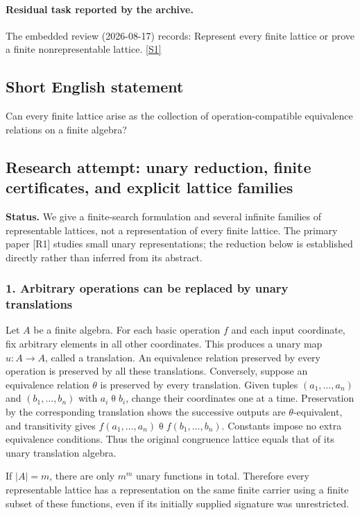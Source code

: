\documentclass[11pt,a4paper]{article}
\newcommand{\sref}[2]{\hyperlink{source:#1:#2}{[S#2]}}
\begin{document}
\paragraph{Residual task reported by the archive.}

The embedded review (2026-08-17) records: Represent every finite lattice or prove a finite nonrepresentable lattice. \sref{1453}{1}

\subsection{Short English statement}

Can every finite lattice arise as the collection of operation-compatible equivalence relations on a finite algebra?

\subsection{Research attempt: unary reduction, finite certificates, and explicit lattice families}
\textbf{Status.} We give a finite-search formulation and several infinite families of representable lattices, not a representation of every finite lattice. The primary paper [R1] studies small unary representations; the reduction below is established directly rather than inferred from its abstract.

\subsubsection{1. Arbitrary operations can be replaced by unary translations}
Let $A$ be a finite algebra. For each basic operation $f$ and each input coordinate, fix arbitrary elements in all other coordinates. This produces a unary map $u:A\to A$, called a translation. An equivalence relation preserved by every operation is preserved by all these translations. Conversely, suppose an equivalence relation $\theta$ is preserved by every translation. Given tuples $(a_1,\ldots,a_n)$ and $(b_1,\ldots,b_n)$ with $a_i\mathrel\theta b_i$, change their coordinates one at a time. Preservation by the corresponding translation shows the successive outputs are $\theta$-equivalent, and transitivity gives $f(a_1,\ldots,a_n)\mathrel\theta f(b_1,\ldots,b_n)$. Constants impose no extra equivalence conditions. Thus the original congruence lattice equals that of its unary translation algebra.

If $|A|=m$, there are only $m^m$ unary functions in total. Therefore every representable lattice has a representation on the same finite carrier using a finite subset of these functions, even if its initially supplied signature was unrestricted.
\end{document}
